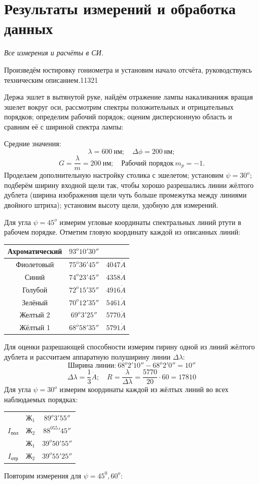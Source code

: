\documentclass[a4paper]{article}
\begin{document}
\section{Результаты измерений и обработка данных}
\emph{Все измерения и расчёты в СИ.}

Произведём юстировку гониометра и установим начало отсчёта, руководствуясь техническим описанием.11321

Держа эшлет в вытянутой руке, найдём отражение лампы накаливанияж вращая эшелет вокруг оси, рассмотрим спектры положительных и отрицательных порядков; определим рабочий порядок; оценим дисперсионную область и сравним её с шириной спектра лампы:

\noindent
Средние значения:
\[
	\lambda = 600\ нм; \quad \Delta \phi = 200\ нм;
\]
\[
	G = \frac{\lambda}{m} = 200\ нм; \quad \text{Рабочий порядок}\ m_p = -1.
\]
Проделаем дополнительную настройку столика с эшелетом; установим $\psi = 30^o$; подберём ширину входной щели так, чтобы хорошо разрешались линии жёлтого дублета (ширина изображения щели чуть больше промежутка между линиями двойного штриха); установим высоту щели, удобную для измерений.

Для угла $\psi = 45^o$ измерим угловые координаты спектральных линий ртути в рабочем порядке. Отметим гловую координату каждой из описанных линий:
\begin{table}[H]
\centering
\begin{tabular}{|c|c|c|}  \hline
Ахроматический & $93^o 10' 30''$ & {} \\\hline
Фиолетовый & $75^o 36' 45''$ & $4047 \dot A$ \\\hline
Синий & $74^o 23' 45''$ & $4358 \dot A$ \\\hline
Голубой & $72^o15'35''$ & $4916 \dot A$ \\\hline
	Зелёный & $70^o12'35''$ & $5461 \dot A$ \\\hline
Желтый 2 & $69^o 3' 25''$ & $5770 \dot A$ \\\hline
Жёлтый 1 & $68^o 58'35''$ & $5791 \dot A$ \\\hline
\end{tabular}
\end{table}
Для оценки разрешающей способности измерим гирину одной из линий жёлтого дублета и рассчитаем аппаратную полуширину линии $\Delta \lambda$:
\[
\text{Ширина линии:}\ 68^o2'10'' - 68^o2'0'' = 10''
\]
\[
\Delta \lambda = \frac{1}{3} \dot A; \quad R = \frac{\lambda}{\Delta \lambda} =\frac{5770}{20} \cdot 60 =  17810
\]
Для угла $\psi = 30^o$ измерим координаты каждой из жёлтых линий во всех наблюдаемых порядках:
\begin{table}[H]
\begin{center}
\begin{tabular}{|c|c|c|} \hline
& $Ж_1$ & $89^o3'55''$ \\
\cline{2-3}
$I_{пол}$
& $Ж_2$ & $88^055'45''$ \\\hline
& $Ж_1$ & $39^o50'55''$ \\
\cline{2-3}
$I_{отр}$
& $Ж_2$ & $39^o55'25''$ \\\hline
\end{tabular}
\end{center}
\end{table}
Повторим измерения для $\psi = 45^0, 60^o$:
\end{document}
